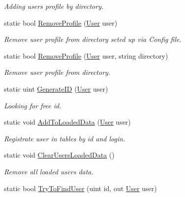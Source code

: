 \begin{DoxyCompactItemize}
\begin{DoxyCompactList}\small\item\em Adding user\textquotesingle{}s profile by directory. \end{DoxyCompactList}\item 
static bool \mbox{\hyperlink{class_authority_controller_1_1_a_p_i_1_1_users_a7239ac583f20a03adc376681494b82bb}{Remove\+Profile}} (\mbox{\hyperlink{class_authority_controller_1_1_data_1_1_user}{User}} user)
\begin{DoxyCompactList}\small\item\em Remove user profile from directory seted up via Config file. \end{DoxyCompactList}\item 
static bool \mbox{\hyperlink{class_authority_controller_1_1_a_p_i_1_1_users_aa57a37410c6bc6a47ee79c0d3438b028}{Remove\+Profile}} (\mbox{\hyperlink{class_authority_controller_1_1_data_1_1_user}{User}} user, string directory)
\begin{DoxyCompactList}\small\item\em Remove user profile from directory. \end{DoxyCompactList}\item 
static uint \mbox{\hyperlink{class_authority_controller_1_1_a_p_i_1_1_users_ae0fd30410e8632a3ee5d8dc24e722fac}{Generate\+ID}} (\mbox{\hyperlink{class_authority_controller_1_1_data_1_1_user}{User}} user)
\begin{DoxyCompactList}\small\item\em Looking for free id. \end{DoxyCompactList}\item 
static void \mbox{\hyperlink{class_authority_controller_1_1_a_p_i_1_1_users_a9cdaba595a8b1d2e49690bebeca969d2}{Add\+To\+Loaded\+Data}} (\mbox{\hyperlink{class_authority_controller_1_1_data_1_1_user}{User}} user)
\begin{DoxyCompactList}\small\item\em Registrate user in tables by id and login. \end{DoxyCompactList}\item 
static void \mbox{\hyperlink{class_authority_controller_1_1_a_p_i_1_1_users_a4c078940968eaa39c6d9eff30f1f90dc}{Clear\+Users\+Loaded\+Data}} ()
\begin{DoxyCompactList}\small\item\em Remove all loaded users data. \end{DoxyCompactList}\item 
static bool \mbox{\hyperlink{class_authority_controller_1_1_a_p_i_1_1_users_abd0e68d6f6f3c77682e995b939daaea9}{Try\+To\+Find\+User}} (uint id, out \mbox{\hyperlink{class_authority_controller_1_1_data_1_1_user}{User}} user)

\end{DoxyCompactItemize}
